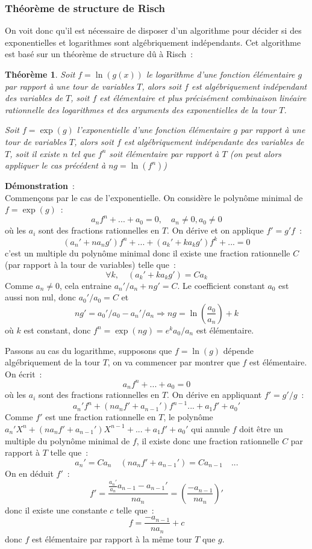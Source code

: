 \documentclass[a4paper,11pt]{article}
\newtheorem{thm}{Théorème}
\begin{document}
\subsubsection{Théorème de structure de Risch}
On voit donc qu'il est nécessaire de disposer d'un algorithme
pour décider si des exponentielles et logarithmes sont
algébriquement indépendants. Cet algorithme est basé sur
un théorème de structure dû à Risch~:
\begin{thm}
Soit $f=\ln(g(x))$ le logarithme d'une fonction élémentaire
$g$ par rapport à une tour de variables $T$, alors soit $f$
est algébriquement indépendant des variables de $T$, soit $f$ est
élémentaire et plus précisément combinaison linéaire rationnelle
des logarithmes et des arguments des exponentielles de la tour $T$.

Soit $f=\exp(g)$ l'exponentielle d'une fonction élémentaire $g$
par rapport à une tour de variables $T$, alors soit $f$
est algébriquement indépendante des variables de $T$, soit
il existe $n$ tel que $f^n$ soit élémentaire par rapport à $T$ 
(on peut alors appliquer le cas précédent à $ng=\ln(f^n)$)
\end{thm}

{\bf Démonstration}~:\\
Commençons par le cas de l'exponentielle. On considère le polynôme minimal
de $f=\exp(g)$~:
\[ a_n f^n+...+a_0=0, \quad a_n \neq 0 , a_0 \neq 0\]
où les $a_i$ sont des fractions rationnelles en $T$. On dérive
et on applique $f'=g'f$~:
\[ (a_n'+n a_n g') f^n +   ... + ( a_{k}' + ka_k g')f^{k} +... =0\]
c'est un multiple du polynôme minimal donc il existe une fraction rationnelle
$C$ (par rapport à la tour de variables) telle que~:
\[ \forall k, \quad (a_k'+k a_k g') = C a_k\]
Comme $a_n\neq 0$, cela entraine $a_n'/a_n+ng'=C$. Le coefficient
constant $a_0$ est aussi non nul, donc $a_0'/a_0=C$ et 
\[ n g' = a_0'/a_0 - a_n'/a_n \Rightarrow ng=\ln(\frac{a_0}{a_n}) + k\]
où $k$ est constant, donc $f^n=\exp(ng)=e^k a_0/a_n$ est élémentaire.

Passons au cas du logarithme, supposons que $f=\ln(g)$ dépende
algébriquement de la tour $T$, on va commencer par montrer que
$f$ est élémentaire. On écrit~:
\[ a_n f^n+...+a_0=0\]
où les $a_i$ sont des fractions rationnelles en $T$. On dérive en
appliquant $f'=g'/g$~:
\[ a_n' f^n + (n a_n f' + a_{n-1}')f^{n-1}  ... + a_1 f'+a_0 '\]
Comme $f'$ est une fraction rationnelle en $T$, le polynôme
$a_n' X^n + (n a_n f'+a_{n-1}') X^{n-1}+...+ a_1 f'+a_0'$ qui annule $f$
doit être un multiple du polynôme minimal de $f$, il existe donc
une fraction rationnelle $C$ par rapport à $T$ telle que~:
\[ a_n' = C a_n \quad (n a_n f'+a_{n-1}') = C a_{n-1} \quad ... \]
On en déduit $f'$~:
\[ f'=\frac{\frac{a_n'}{a_n} a_{n-1}-a_{n-1}'}{n a_n} = 
\left(\frac{-a_{n-1}}{n a_n}\right)'\]
donc il existe une constante $c$ telle que~:
\[ f=\frac{-a_{n-1}}{n a_n}+c\]
donc $f$ est élémentaire par rapport à la même tour $T$ que $g$.
\end{document}
